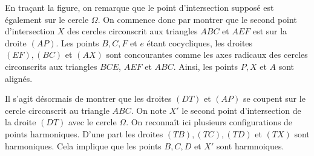 \begin{sol}
\begin{center}
\end{center}

En traçant la figure, on remarque que le point d'intersection supposé est également sur le cercle $\Omega$. On commence donc par montrer que le second point d'intersection $X$ des cercles circonscrit aux triangles $ABC$ et $AEF$ est sur la droite $(AP)$. Les points $B,C,F$ et $e$ étant cocycliques, les droites $(EF),(BC)$ et $(AX)$ sont concourantes comme les axes radicaux des cercles circonscrits aux triangles $BCE$, $AEF$ et $ABC$. Ainsi, les points $P,X$ et $A$ sont alignés. 

\medskip

Il s'agit désormais de montrer que les droites $(DT)$ et $(AP)$ se coupent sur le cercle circonscrit au triangle $ABC$. On note $X'$ le second point d'intersection de la droite $(DT)$ avec le cercle $\Omega$. On reconnaît ici plusieurs configurations de points harmoniques. D'une part les droites $(TB),(TC), (TD)$ et $(TX)$ sont harmoniques. Cela implique que les points $B,C,D$ et $X'$ sont harmnoiques. 


\end{sol}

